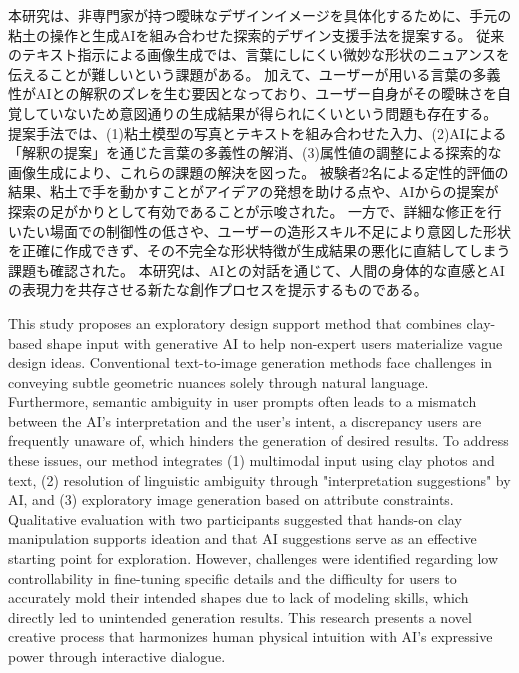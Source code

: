 \documentclass{kuisthesis}
\date{令和8年2月2日}
\begin{document}
\maketitle
\begin{jabstract}
本研究は、非専門家が持つ曖昧なデザインイメージを具体化するために、手元の粘土の操作と生成AIを組み合わせた探索的デザイン支援手法を提案する。 
従来のテキスト指示による画像生成では、言葉にしにくい微妙な形状のニュアンスを伝えることが難しいという課題がある。 
加えて、ユーザーが用いる言葉の多義性がAIとの解釈のズレを生む要因となっており、ユーザー自身がその曖昧さを自覚していないため意図通りの生成結果が得られにくいという問題も存在する。
提案手法では、(1)粘土模型の写真とテキストを組み合わせた入力、(2)AIによる「解釈の提案」を通じた言葉の多義性の解消、(3)属性値の調整による探索的な画像生成により、これらの課題の解決を図った。 
被験者2名による定性的評価の結果、粘土で手を動かすことがアイデアの発想を助ける点や、AIからの提案が探索の足がかりとして有効であることが示唆された。 
一方で、詳細な修正を行いたい場面での制御性の低さや、ユーザーの造形スキル不足により意図した形状を正確に作成できず、その不完全な形状特徴が生成結果の悪化に直結してしまう課題も確認された。 
本研究は、AIとの対話を通じて、人間の身体的な直感とAIの表現力を共存させる新たな創作プロセスを提示するものである。
\end{jabstract}
\begin{eabstract}
This study proposes an exploratory design support method that combines clay-based shape input with generative AI to help non-expert users materialize vague design ideas. 
Conventional text-to-image generation methods face challenges in conveying subtle geometric nuances solely through natural language. 
Furthermore, semantic ambiguity in user prompts often leads to a mismatch between the AI's interpretation and the user's intent, a discrepancy users are frequently unaware of, which hinders the generation of desired results. 
To address these issues, our method integrates (1) multimodal input using clay photos and text, (2) resolution of linguistic ambiguity through "interpretation suggestions" by AI, and (3) exploratory image generation based on attribute constraints. 
Qualitative evaluation with two participants suggested that hands-on clay manipulation supports ideation and that AI suggestions serve as an effective starting point for exploration. 
However, challenges were identified regarding low controllability in fine-tuning specific details and the difficulty for users to accurately mold their intended shapes due to lack of modeling skills, which directly led to unintended generation results. 
This research presents a novel creative process that harmonizes human physical intuition with AI's expressive power through interactive dialogue.
\end{eabstract}
\tableofcontents %
\end{document}
